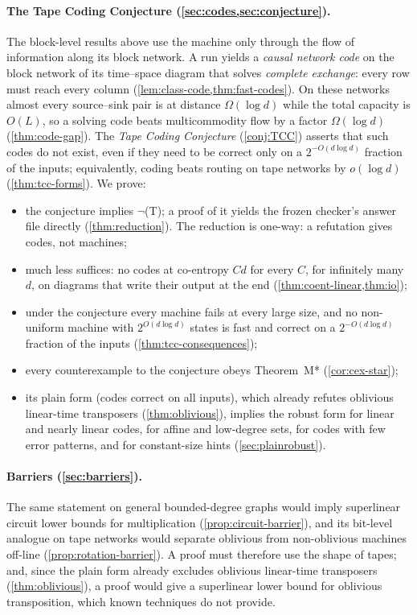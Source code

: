 \paragraph{The Tape Coding Conjecture (\cref{sec:codes,sec:conjecture}).} The block-level results above use the machine only
through the flow of information along its block network. A run yields a \emph{causal network code} on the block
network of its time--space diagram that solves \emph{complete exchange}: every row must reach every column
(\cref{lem:class-code,thm:fast-codes}). On these networks almost every source--sink pair is at distance
$\Omega(\log d)$ while the total capacity is $O(L)$, so a solving code beats multicommodity flow by a factor
$\Omega(\log d)$ (\cref{thm:code-gap}). The \emph{Tape Coding Conjecture}
(\cref{conj:TCC}) asserts that such codes do not exist, even if they need to be correct only on a $2^{-O(d\log d)}$
fraction of the inputs; equivalently, coding beats routing on tape networks by $o(\log d)$ (\cref{thm:tcc-forms}). We
prove:
\begin{itemize}[leftmargin=2em]
\item the conjecture implies $\neg$(T); a proof of it yields the frozen checker's answer file directly
(\cref{thm:reduction}). The reduction is one-way: a refutation gives codes, not machines;
\item much less suffices: no codes at co-entropy $Cd$ for every $C$, for infinitely many $d$, on diagrams that write
their output at the end (\cref{thm:coent-linear,thm:io});
\item under the conjecture every machine fails at every large size, and no non-uniform machine with $2^{O(d\log d)}$
states is fast and correct on a $2^{-O(d\log d)}$ fraction of the inputs (\cref{thm:tcc-consequences});
\item every counterexample to the conjecture obeys Theorem~M* (\cref{cor:cex-star});
\item its plain form (codes correct on all inputs), which already refutes oblivious linear-time transposers
(\cref{thm:oblivious}), implies the robust form for linear and nearly linear codes, for affine and low-degree sets,
for codes with few error patterns, and for constant-size hints (\cref{sec:plainrobust}).
\end{itemize}

\paragraph{Barriers (\cref{sec:barriers}).} The same statement on general bounded-degree graphs would imply superlinear
circuit lower bounds for multiplication (\cref{prop:circuit-barrier}), and its bit-level analogue on tape networks
would separate oblivious from non-oblivious machines off-line (\cref{prop:rotation-barrier}). A proof must therefore use
the shape of tapes; and, since the plain form already excludes oblivious linear-time transposers
(\cref{thm:oblivious}), a proof would give a superlinear lower bound for oblivious transposition, which known
techniques do not provide.


